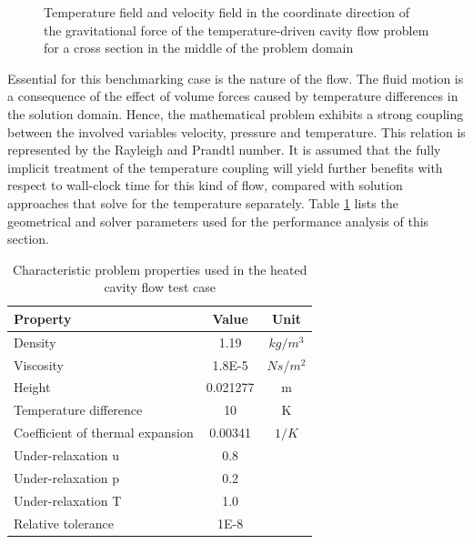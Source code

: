 \begin{figure}[h!]
{\begin{minipage}{0.45\textwidth}
\end{minipage} }
  \caption{Temperature field and velocity field in the coordinate direction of the gravitational force of the temperature-driven cavity flow problem for a cross section in the middle of the problem domain }
  \label{fig:sketchcavity}
\end{figure}

Essential for this benchmarking case is the nature of the flow. The fluid motion is a consequence of the effect of volume forces caused by temperature differences in the solution domain. Hence, the mathematical problem exhibits a strong coupling between the involved variables velocity, pressure and temperature. This relation is represented by the Rayleigh and Prandtl number. It is assumed that the fully implicit treatment of the temperature coupling will yield further benefits with respect to wall-clock time for this kind of flow, compared with solution approaches that solve for the temperature separately. Table \ref{tab:cavity} lists the geometrical and solver parameters used for the performance analysis of this section.

\begin{table}[h!]\centering
  \caption{Characteristic problem properties used in the heated cavity flow test case}
  \begin{tabular}{lcc}\toprule
    Property & Value & Unit \\
    \midrule
    \rowcolor{black!20} Density            & 1.19      & $kg/m^3$  \\
    \rowcolor{black!00} Viscosity          & 1.8E-5    & $Ns/m^2$  \\
    \rowcolor{black!20} Height             & 0.021277  & m         \\
    \rowcolor{black!00} Temperature difference & 10    & K         \\
    \rowcolor{black!20} Coefficient of thermal expansion & 0.00341 & $1/K$ \\
    \rowcolor{black!00} Under-relaxation u & 0.8       &           \\
    \rowcolor{black!20} Under-relaxation p & 0.2       &           \\
    \rowcolor{black!00} Under-relaxation T & 1.0       &           \\
    \rowcolor{black!20} Relative tolerance & 1E-8      &
  \end{tabular}
  \label{tab:cavity}
\end{table}

